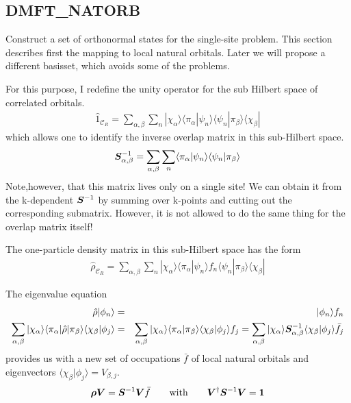 \documentclass[11pt,a4paper]{report}
\begin{document}
\subsection{DMFT\_NATORB}
\label{sec:routinedmftnatorb}
Construct a set of orthonormal states for the single-site problem.
This section describes first the mapping to local natural
orbitals. Later we will propose a different basisset, which avoids
some of the problems.

For this purpose, I redefine the unity operator for the sub Hilbert
space of correlated orbitals.
\begin{eqnarray}
\hat{1}_{\mathcal{C}_R}
=\sum_{\alpha,\beta}\sum_n
|\chi_\alpha\rangle
\langle\pi_\alpha|\psi_n\rangle\langle\psi_n|\pi_\beta\rangle
\langle\chi_\beta|
\end{eqnarray}
which allows one to identify the inverse overlap matrix in this
sub-Hilbert space.
\begin{eqnarray}
\bm{S}^{-1}_{\alpha,\beta}
=\sum_{\alpha,\beta}\sum_n
\langle\pi_\alpha|\psi_n\rangle\langle\psi_n|\pi_\beta\rangle
\end{eqnarray}
Note,however, that this matrix lives only on a single site! We can
obtain it from the k-dependent $\bm{S}^{-1}$ by summing over k-points
and cutting out the corresponding submatrix. However, it is not
allowed to do the same thing for the overlap matrix itself!

The one-particle density matrix in this sub-Hilbert space has the form
\begin{eqnarray}
\hat{\rho}_{\mathcal{C}_R}
=\sum_{\alpha,\beta}\sum_n
|\chi_\alpha\rangle
\langle\pi_\alpha|\psi_n\rangle f_n \langle\psi_n|\pi_\beta\rangle
\langle\chi_\beta|
\end{eqnarray}

The eigenvalue equation
\begin{eqnarray}
\hat{\rho}|\phi_n\rangle&=&|\phi_n\rangle f_n
\nonumber\\
\sum_{\alpha,\beta}|\chi_\alpha\rangle
\langle\pi_\alpha|\hat{\rho}|\pi_\beta\rangle\langle\chi_\beta|\phi_j\rangle
&=&\sum_{\alpha,\beta}|\chi_\alpha\rangle\langle\pi_\alpha|\pi_\beta\rangle
\langle\chi_\beta|\phi_j\rangle f_j
=\sum_{\alpha,\beta}|\chi_\alpha\rangle
\bm{S}^{-1}_{\alpha,\beta}\langle\chi_\beta|\phi_j\rangle \bar{f}_j
\end{eqnarray}
provides us with a new set of occupations $\bar{f}$ of local natural
orbitals and eigenvectors
$\langle\chi_\beta|\phi_j\rangle=V_{\beta,j}$.
\begin{eqnarray}
\bm{\rho}\bm{V}=\bm{S}^{-1}\bm{V}\bar{f}
\qquad\text{with}\qquad
\bm{V}^\dagger\bm{S}^{-1}\bm{V}=\bm{1}
\label{eq:eigenvaluprobforlocalnatorb}
\end{eqnarray}
\end{document}
